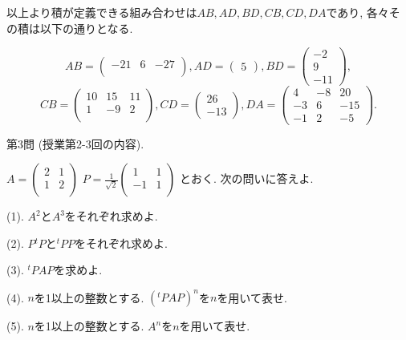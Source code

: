 \documentclass[dvipdfmx,a4paper,11pt]{article}
\theoremstyle{definition}
\begin{document}
以上より積が定義できる組み合わせは$AB, AD, BD, CB, CD, DA$であり, 各々その積は以下の通りとなる.

$$AB = 
 \begin{pmatrix} %
 -21& 6 &-27  \\
 \end{pmatrix},
 AD = \begin{pmatrix} %
5
 \end{pmatrix}, 
 BD =  \begin{pmatrix} %
-2 \\
9 \\
-11
 \end{pmatrix},
  $$
 $$
 CB =  \begin{pmatrix} %
10 & 15 & 11\\
1 & -9 & 2\\
 \end{pmatrix},
 CD
= 
 \begin{pmatrix} %
26 \\
-13
 \end{pmatrix},
 DA
= 
 \begin{pmatrix} %
4 & -8 & 20 \\
-3 & 6 & -15\\
-1 & 2 & -5
 \end{pmatrix}.
 $$

 \vspace{22pt}
 
   
   {\Large 第3問} (授業第2-3回の内容).
    \vspace{11pt}
    
    $
A = \begin{pmatrix} %
2 & 1\\
1 & 2\\
 \end{pmatrix}
 $
 $
P =\frac{1}{\sqrt{2}} 
\begin{pmatrix} %
1& 1\\
-1 & 1\\
 \end{pmatrix}
 $
 とおく. 次の問いに答えよ.
     \vspace{11pt}
 
(1). $A^2$と$A^3$をそれぞれ求めよ.
 
(2). $P{}^tP$と${}^t PP$をそれぞれ求めよ. %

(3). ${}^tP A P$を求めよ.

(4). $n$を1以上の整数とする. $({}^tP A P)^n$を$n$を用いて表せ.

(5). $n$を1以上の整数とする. $A^n$を$n$を用いて表せ.
 
\end{document}

